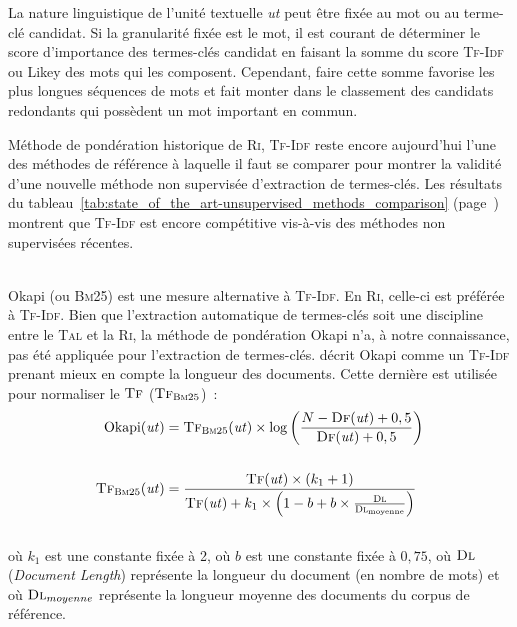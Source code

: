         La nature linguistique de l'unité textuelle \textit{ut} peut être fixée
        au mot ou au terme-clé candidat. Si la granularité fixée est le mot, il
        est courant de déterminer le score d'importance des termes-clés candidat
        en faisant la somme du score \textsc{Tf-Idf} ou Likey des mots qui les
        composent. Cependant, faire cette somme favorise les plus longues
        séquences de mots et fait monter dans le classement des candidats
        redondants qui possèdent un mot important en commun.

        Méthode de pondération historique de \textsc{Ri}, \textsc{Tf-Idf} reste
        encore aujourd'hui l'une des méthodes de référence à laquelle il faut se
        comparer pour montrer la validité d'une nouvelle méthode non supervisée
        d'extraction de termes-clés. Les résultats du
        tableau~\ref{tab:state_of_the_art-unsupervised_methods_comparison}
        (page~\pageref{tab:state_of_the_art-unsupervised_methods_comparison})
        montrent que \textsc{Tf-Idf} est encore compétitive vis-à-vis des
        méthodes non supervisées récentes.

        ~\\Okapi (ou \textsc{Bm}25) \cite{robertson1999okapi} est une mesure
        alternative à \textsc{Tf-Idf}. En \textsc{Ri},
        celle-ci est préférée à \textsc{Tf-Idf}. Bien que l'extraction
        automatique de termes-clés soit une discipline entre le
        \textsc{Tal} et la \textsc{Ri}, la méthode de pondération Okapi n'a, à
        notre connaissance, pas été appliquée pour l'extraction de termes-clés.
         décrit Okapi comme un \textsc{Tf-Idf}
        prenant mieux en compte la longueur des documents. Cette dernière est
        utilisée pour normaliser le $\textsc{Tf}$
        ($\textsc{Tf}_{\textsc{Bm}25}$)~:
        \begin{align}
          \text{Okapi}(\text{\textit{ut}}) &= \textsc{Tf}_{\textsc{Bm}25}(\text{\textit{ut}}) \times \log\left(\frac{N - \textsc{Df}(\text{\textit{ut}}) + 0,5}{\textsc{Df}(\text{\textit{ut}}) + 0,5}\right) \label{math:okapi}\\
          \notag\\
          \textsc{Tf}_{\textsc{Bm}25}(\text{\textit{ut}}) &= \frac{\textsc{Tf}(\text{\textit{ut}}) \times (k_1 + 1)}{\textsc{Tf}(\text{\textit{ut}}) + k_1 \times \left(1 - b + b \times \frac{\textsc{Dl}}{\textsc{Dl}_{\text{moyenne}}}\right)} \label{math:tf_bm25}
        \end{align}\\
        où $k_1$ est une constante fixée à 2, où $b$ est une constante fixée à
        $0,75$, où $\textsc{Dl}$ (\textit{Document Length}) représente la
        longueur du document (en nombre de mots) et où $\textsc{Dl}_{moyenne}$
        représente la longueur moyenne des documents du corpus de référence.

